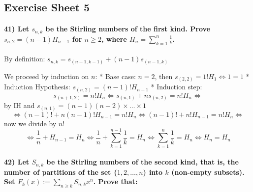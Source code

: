 \documentclass[
]{article}
\begin{document}
\hypertarget{exercise-sheet-5}{%
\subsection{Exercise Sheet 5}\label{exercise-sheet-5}}

\hypertarget{let-s_nk-be-the-stirling-numbers-of-the-first-kind.-prove-s_n2-n-1-h_n-1-for-n-geq-2-where-h_n-sum_k1n-frac1k.}{%
\paragraph{\texorpdfstring{41) Let \(s_{n,k}\) be the Stirling numbers
of the first kind. Prove \(s_{n,2} = (n-1) H_{n-1}\) for \(n \geq 2\),
where
\(H_n = \sum_{k=1}^n \frac{1}{k}\).}{41) Let s\_\{n,k\} be the Stirling numbers of the first kind. Prove s\_\{n,2\} = (n-1) H\_\{n-1\} for n \textbackslash geq 2, where H\_n = \textbackslash sum\_\{k=1\}\^{}n \textbackslash frac\{1\}\{k\}.}}\label{let-s_nk-be-the-stirling-numbers-of-the-first-kind.-prove-s_n2-n-1-h_n-1-for-n-geq-2-where-h_n-sum_k1n-frac1k.}}

By definition: \(s_{n,k} = s_{(n-1, k-1)} + (n-1) s_{(n-1,k)}\)

We proceed by induction on \(n\): * Base case: \(n=2\), then
\(s_(2,2) = 1! H_1 \Leftrightarrow 1 = 1\) * Induction Hypothesis:
\(s_{(n,2)} = (n-1)! H_{n-1}\) * Induction step: \[
        s_{(n+1,2)} = n! H_n \Leftrightarrow s_{(n,1)} + n s_{(n,2)} = n! H_n \Leftrightarrow
        \] by IH and \(s_{(n,1)} = (n-1)(n-2) \times \dots \times 1\) \[
        \Leftrightarrow (n-1)! + n (n-1)! H_{n-1} = n! H_n \Leftrightarrow (n-1)! + n! H_{n-1} = n! H_n \Leftrightarrow
        \] now we divide by \(n!\) \[
        \Leftrightarrow \frac{1}{n} + H_{n-1} = H_n \Leftrightarrow \frac{1}{n} + \sum_{k=1}^{n-1} \frac{1}{k} = H_n \Leftrightarrow \sum_{k=1}^{n} \frac{1}{k} = H_n \Leftrightarrow H_n = H_n
        \]

\hypertarget{let-s_nk-be-the-stirling-numbers-of-the-second-kind-that-is-the-number-of-partitions-of-the-set-12-dots-n-into-k-non-empty-subsets.-set-f_kx-sum_n-geq-k-s_nk-xn.-prove-that}{%
\paragraph{\texorpdfstring{42) Let \(S_{n,k}\) be the Stirling numbers
of the second kind, that is, the number of partitions of the set
\(\{1,2, \dots, n\}\) into \(k\) (non-empty subsets). Set
\(F_k(x) := \sum_{n \geq k} S_{n,k} x^n\). Prove
that:}{42) Let S\_\{n,k\} be the Stirling numbers of the second kind, that is, the number of partitions of the set \textbackslash\{1,2, \textbackslash dots, n\textbackslash\} into k (non-empty subsets). Set F\_k(x) := \textbackslash sum\_\{n \textbackslash geq k\} S\_\{n,k\} x\^{}n. Prove that:}}\label{let-s_nk-be-the-stirling-numbers-of-the-second-kind-that-is-the-number-of-partitions-of-the-set-12-dots-n-into-k-non-empty-subsets.-set-f_kx-sum_n-geq-k-s_nk-xn.-prove-that}}
\end{document}
